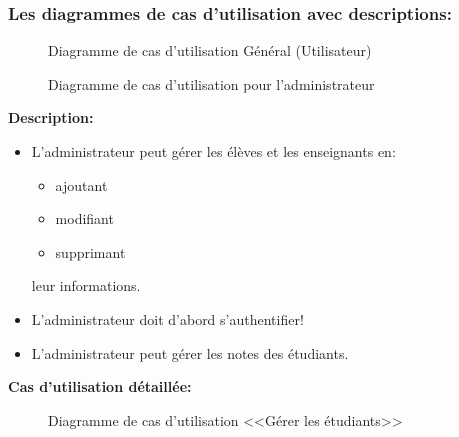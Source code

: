 \documentclass[12pt]{report}
\begin{document}
\vspace{-0.3in}

\subsubsection{\large{Les diagrammes de cas d'utilisation avec descriptions:}}

\begin{figure}[h]
\centering
    \caption{Diagramme de cas d'utilisation Général (Utilisateur)}
\end{figure}

\newpage

\begin{figure}[h]
\centering
    \caption{Diagramme de cas d'utilisation pour l'administrateur}
\end{figure}

\textbf{Description:}

\begin{itemize}
    \item L'administrateur peut gérer les élèves et les enseignants en:
    \begin{itemize}
        \item ajoutant
        \item modifiant
        \item supprimant
    \end{itemize}
    leur informations.
    \item L'administrateur doit d'abord s'authentifier!
    \item L'administrateur peut gérer les notes des étudiants.
\end{itemize}

\newpage

\textbf{Cas d'utilisation détaillée:}

\vspace{0.3in}

\begin{figure}[h]
\centering
    \caption*{Diagramme de cas d'utilisation <<Gérer les étudiants>>}
\end{figure}
\end{document}
